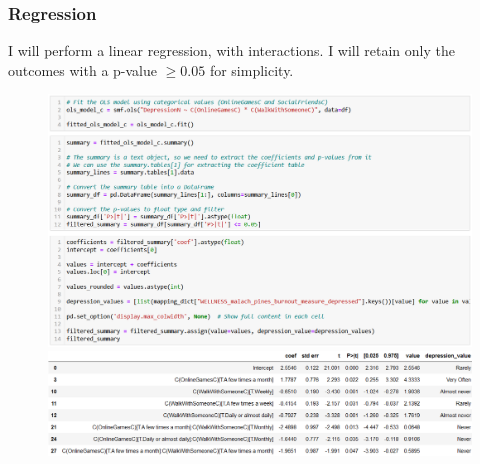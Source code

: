 \documentclass{beamer}
\begin{document}
\begin{frame}

\frametitle{Regression}

I will perform a linear regression, with interactions. I will retain only the outcomes with a p-value $\geq 0.05$ for simplicity.

\begin{figure}
    \centering
    \includegraphics[width=0.6\linewidth]{jason_regression.png}
    \includegraphics[width=0.6\linewidth]{jason_regressionoutcome.png}
\end{figure}

\end{frame}
\end{document}
